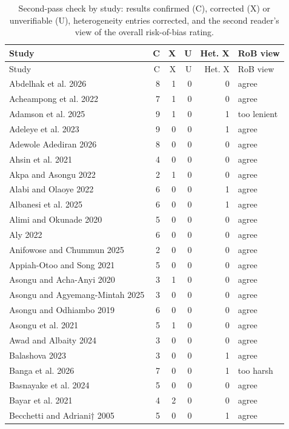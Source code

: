 {\scriptsize\setlength{\tabcolsep}{3pt}
\begin{longtable}{@{}p{4cm} r r r r l@{}}
\caption{Second-pass check by study: results confirmed (C), corrected (X) or unverifiable (U), heterogeneity entries corrected, and the second reader's view of the overall risk-of-bias rating.}\label{tab:secondpass}\\
\toprule Study & C & X & U & Het. X & RoB view \\ \midrule \endfirsthead
\toprule Study & C & X & U & Het. X & RoB view \\ \midrule \endhead
\bottomrule \endfoot
Abdelhak et al. 2026 & 8 & 1 & 0 & 0 & agree \\
Acheampong et al. 2022 & 7 & 1 & 0 & 0 & agree \\
Adamson et al. 2025 & 9 & 1 & 0 & 1 & too lenient \\
Adeleye et al. 2023 & 9 & 0 & 0 & 1 & agree \\
Adewole Adediran 2026 & 8 & 0 & 0 & 0 & agree \\
Ahsin et al. 2021 & 4 & 0 & 0 & 0 & agree \\
Akpa and Asongu 2022 & 2 & 1 & 0 & 0 & agree \\
Alabi and Olaoye 2022 & 6 & 0 & 0 & 1 & agree \\
Albanesi et al. 2025 & 6 & 0 & 0 & 1 & agree \\
Alimi and Okunade 2020 & 5 & 0 & 0 & 0 & agree \\
Aly 2022 & 6 & 0 & 0 & 0 & agree \\
Anifowose and Chummun 2025 & 2 & 0 & 0 & 0 & agree \\
Appiah-Otoo and Song 2021 & 5 & 0 & 0 & 0 & agree \\
Asongu and Acha-Anyi 2020 & 3 & 1 & 0 & 0 & agree \\
Asongu and Agyemang-Mintah 2025 & 3 & 0 & 0 & 0 & agree \\
Asongu and Odhiambo 2019 & 6 & 0 & 0 & 0 & agree \\
Asongu et al. 2021 & 5 & 1 & 0 & 0 & agree \\
Awad and Albaity 2024 & 3 & 0 & 0 & 0 & agree \\
Balashova 2023 & 3 & 0 & 0 & 1 & agree \\
Banga et al. 2026 & 7 & 0 & 0 & 1 & too harsh \\
Basnayake et al. 2024 & 5 & 0 & 0 & 0 & agree \\
Bayar et al. 2021 & 4 & 2 & 0 & 0 & agree \\
Becchetti and Adriani† 2005 & 5 & 0 & 0 & 1 & agree \\

\end{longtable}}
